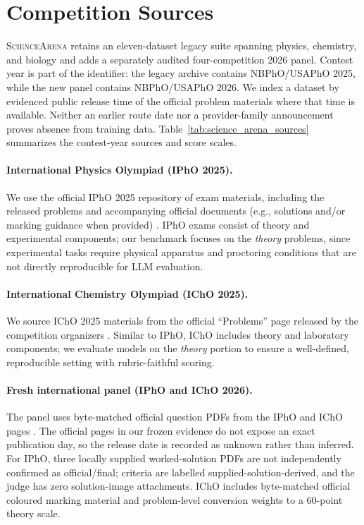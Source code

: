 \documentclass[11pt]{article}
\begin{document}
\section{Competition Sources}
\label{app:competitions}

\textsc{ScienceArena} retains an eleven-dataset legacy suite spanning physics, chemistry, and biology and adds a separately audited four-competition 2026 panel. Contest year is part of the identifier: the legacy archive contains NBPhO/USAPhO 2025, while the new panel contains NBPhO/USAPhO 2026. We index a dataset by evidenced public release time of the official problem materials where that time is available. Neither an earlier route date nor a provider-family announcement proves absence from training data. Table~\ref{tab:science_arena_sources} summarizes the contest-year sources and score scales.

\paragraph{International Physics Olympiad (IPhO 2025).}
We use the official IPhO 2025 repository of exam materials, including the released problems and accompanying official documents (e.g., solutions and/or marking guidance when provided) \citep{ipho2025_official_questions}. IPhO exams consist of theory and experimental components; our benchmark focuses on the \emph{theory} problems, since experimental tasks require physical apparatus and proctoring conditions that are not directly reproducible for LLM evaluation.

\paragraph{International Chemistry Olympiad (IChO 2025).}
We source IChO 2025 materials from the official ``Problems'' page released by the competition organizers \citep{icho2025_problems_page}. Similar to IPhO, IChO includes theory and laboratory components; we evaluate models on the \emph{theory} portion to ensure a well-defined, reproducible setting with rubric-faithful scoring.

\paragraph{Fresh international panel (IPhO and IChO 2026).}
The panel uses byte-matched official question PDFs from the IPhO and IChO pages \citep{ipho2026_official_questions,icho2026_official_problems}. The official pages in our frozen evidence do not expose an exact publication day, so the release date is recorded as unknown rather than inferred. For IPhO, three locally supplied worked-solution PDFs are not independently confirmed as official/final; criteria are labelled supplied-solution-derived, and the judge has zero solution-image attachments. IChO includes byte-matched official coloured marking material and problem-level conversion weights to a 60-point theory scale.
\end{document}
